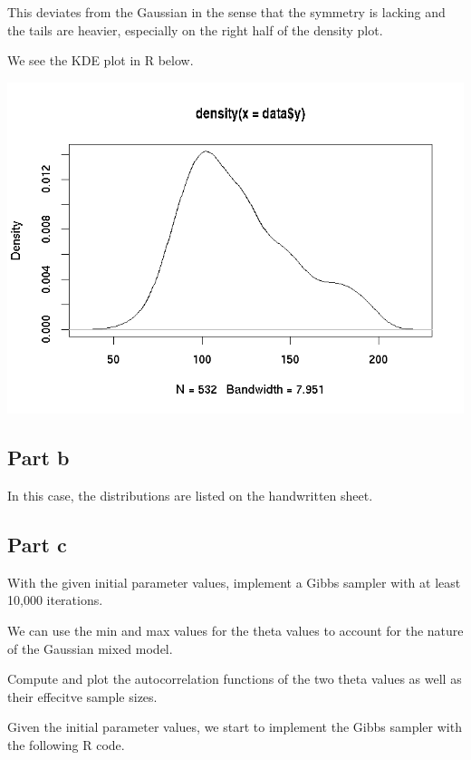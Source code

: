 \documentclass[12pt, letterpaper]{article}
\begin{document}
This deviates from the Gaussian in the sense that the symmetry is lacking and the tails are heavier, especially on the right half of the density plot. 

We see the KDE plot in R below. 

\includegraphics[scale=.75]{../../KDE_plot.png} 

\subsection{Part b} 

In this case, the distributions are listed on the handwritten sheet. 

\subsection{Part c}

With the given initial parameter values, implement a Gibbs sampler with at least 10,000 iterations. 

We can use the min and max values for the theta values to account for the nature of the Gaussian mixed model. 

Compute and plot the autocorrelation functions of the two theta values as well as their effecitve sample sizes. 

Given the initial parameter values, we start to implement the Gibbs sampler with the following R code. 
\end{document}
